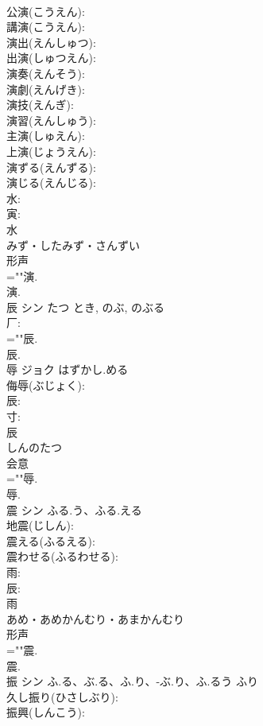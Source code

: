 \documentclass[8pt]{extreport}
\begin{document}
\begin{CJK}{UTF8}{min}
\\	公演(こうえん): 
\\	講演(こうえん): 
\\	演出(えんしゅつ): 
\\	出演(しゅつえん): 
\\	演奏(えんそう): 
\\	演劇(えんげき): 
\\	演技(えんぎ): 
\\	演習(えんしゅう): 
\\	主演(しゅえん): 
\\	上演(じょうえん): 
\\	演ずる(えんずる): 
\\	演じる(えんじる): 
\\	水: 
\\	寅: 
\\	水	
\\	みず・したみず・さんずい	
\\	形声 
\\	=""演.
\\	演.
\\	辰	シン	たつ	とき, のぶ, のぶる	
\\	厂: 
\\	=""辰.
\\	辰.
\\	辱	ジョク	はずかし.める		
\\	侮辱(ぶじょく): 
\\	辰: 
\\	寸: 
\\	辰	
\\	しんのたつ	
\\	会意 
\\	=""辱.
\\	辱.
\\	震	シン	ふる.う、ふる.える		
\\	地震(じしん): 
\\	震える(ふるえる): 
\\	震わせる(ふるわせる): 
\\	雨: 
\\	辰: 
\\	雨	
\\	あめ・あめかんむり・あまかんむり	
\\	形声 
\\	=""震.
\\	震.
\\	振	シン	ふ.る、ぶ.る、ふ.り、-ぶ.り、ふ.るう	ふり	
\\	久し振り(ひさしぶり): 
\\	振興(しんこう): 

\end{CJK}
\end{document}
